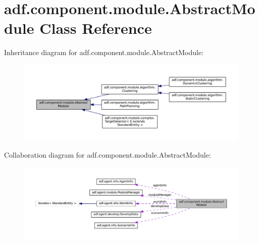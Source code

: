 \hypertarget{classadf_1_1component_1_1module_1_1AbstractModule}{}\section{adf.\+component.\+module.\+Abstract\+Module Class Reference}
\label{classadf_1_1component_1_1module_1_1AbstractModule}


Inheritance diagram for adf.\+component.\+module.\+Abstract\+Module\+:
\nopagebreak
\begin{figure}[H]
\begin{center}
\leavevmode
\includegraphics[width=350pt]{classadf_1_1component_1_1module_1_1AbstractModule__inherit__graph}
\end{center}
\end{figure}


Collaboration diagram for adf.\+component.\+module.\+Abstract\+Module\+:
\nopagebreak
\begin{figure}[H]
\begin{center}
\leavevmode
\includegraphics[width=350pt]{classadf_1_1component_1_1module_1_1AbstractModule__coll__graph}
\end{center}
\end{figure}
